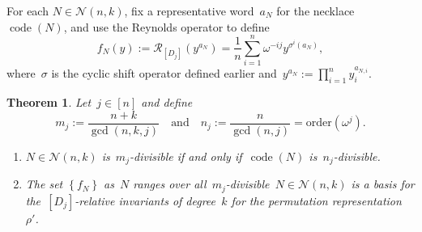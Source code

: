 \documentclass{amsart}
\newtheorem{thm}{Theorem}[section]
\DeclareMathOperator{\code}{code}
\newcommand{\neck}{\mathcal{N}}
\begin{document}
For each $N\in\neck(n,k)$, fix a representative word~$a_N$ for the
necklace~$\code(N)$, and use the Reynolds operator to define \[
f_N(y):=\mathcal{R}_{[D_j]}(y^{a_N})=\frac{1}{n}\sum_{i=1}^n\omega^{-ij}y^{\sigma^i(a_N)},
\] where~$\sigma$ is the cyclic shift operator defined earlier
and~$y^{a_N}:=\prod_{i=1}^ny_i^{a_{N,i}}$.  

\begin{thm}\label{thm: permutation invariants}  Let~$j\in[n]$ and define
\[
  m_j:=\frac{n+k}{\gcd(n,k,j)}\quad\text{and}\quad
  n_j:=\frac{n}{\gcd(n,j)}=\mathrm{order}(\omega^j).
\]
\begin{enumerate}[label=\rm{(\arabic*)},leftmargin=*]
  \item $N\in\neck(n,k)$ is~$m_j$-divisible if and only if~$\code(N)$
    is~$n_j$-divisible.
  \item\label{basis part2}  The set $\left\{ f_N \right\}$
    as~$N$ ranges over all~$m_j$-divisible~$N\in\neck(n,k)$ is a basis for
    the~$[D_j]$-relative invariants of degree~$k$ for the permutation
    representation~$\rho'$.
\end{enumerate}
\end{thm}
\end{document}
